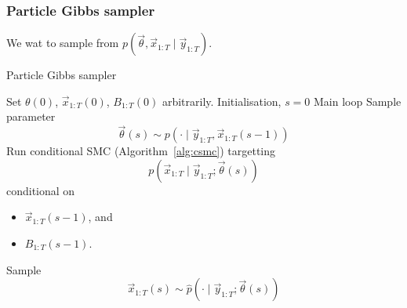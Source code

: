 \subsubsection{Particle Gibbs sampler}
We wat to sample from $p(\vec \theta, \vec x_{1:T} \mid \vec y_{1:T})$.
    \begin{algorithm}
    \caption{Particle Gibbs sampler}\label{alg:pg}
        \begin{algorithmic}[1]
            \State Set $\theta(0)$, $\vec x_{1:T}(0)$, $B_{1:T}(0)$ arbitrarily. \Comment Initialisation, $s = 0$
             \Comment Main loop
                \State Sample parameter
                    $$\vec \theta(s) \sim p\left(\cdot \mid \vec y_{1:T}, \vec x_{1:T}(s - 1)\right)$$
                \State Run conditional SMC (Algorithm~\ref{alg:csmc}) targetting
                    $$p(\vec x_{1:T} \mid \vec y_{1:T}; \vec \theta(s))$$
                    conditional on
                    \begin{itemize}
                        \item $\vec x_{1:T}(s - 1)$, and
                        \item $B_{1:T}(s - 1)$.
                    \end{itemize}
                \State Sample
                    $$\vec x_{1:T}(s) \sim \hat p(\cdot \mid \vec y_{1:T}; \vec \theta(s))$$
            \EndFor
        \end{algorithmic}
    \end{algorithm}